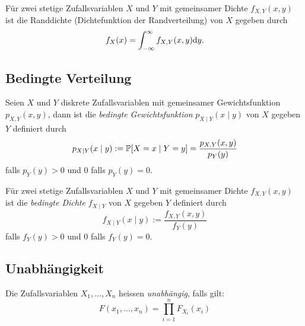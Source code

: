 \begin{definition}[Randdichte]

	Für zwei stetige Zufallsvariablen \(X\) und \(Y\) mit gemeinsamer Dichte \(f_{X,Y}(x,y)\) ist die Randdichte (Dichtefunktion der Randverteilung) von \(X\) gegeben durch
	\[
		f_X(x) = \int_{-\infty}^\infty f_{X,Y}(x,y) \d y.
	\]
\end{definition}




\subsection{Bedingte Verteilung}

\begin{definition}
	Seien \(X\) und \(Y\) diskrete Zufallsvariablen mit gemeinsamer Gewichtsfunktion \(p_{X,Y}(x,y)\),
	dann ist die \emph{bedingte Gewichtsfunktion} \(p_{X \mid Y}(x \mid y)\) von \(X\) gegeben \(Y\) definiert durch
	\[
		p_{X \mid Y}(x \mid y) := \P[X = x \mid Y = y] = \frac{p_{X,Y}(x,y)}{p_Y(y)}
	\]
	falls \(p_Y(y) > 0\) und \(0\) falls \(p_Y(y) = 0\).
\end{definition}

\begin{definition}
	Für zwei stetige Zufallsvariablen \(X\) und \(Y\) mit gemeinsamer Dichte \(f_{X,Y}(x,y)\) ist
	die \emph{bedingte Dichte} \(f_{X \mid Y}\) von \(X\) gegeben \(Y\) definiert durch
	\[
		f_{X \mid Y}(x \mid y) := \frac{f_{X,Y}(x,y)}{f_Y(y)}
	\]
	falls \(f_Y(y) > 0\) und \(0\) falls \(f_Y(y) = 0\).
\end{definition}




\subsection{Unabhängigkeit}

\begin{definition}[Unabhängigkeit]

	Die Zufallsvariablen \(X_1,\ldots,X_n\) heissen \emph{unabhängig}, falls gilt:
	\[
		F(x_1,\ldots,x_n) = \prod_{i=1}^n F_{X_i}(x_i)
	\]

\end{definition}

